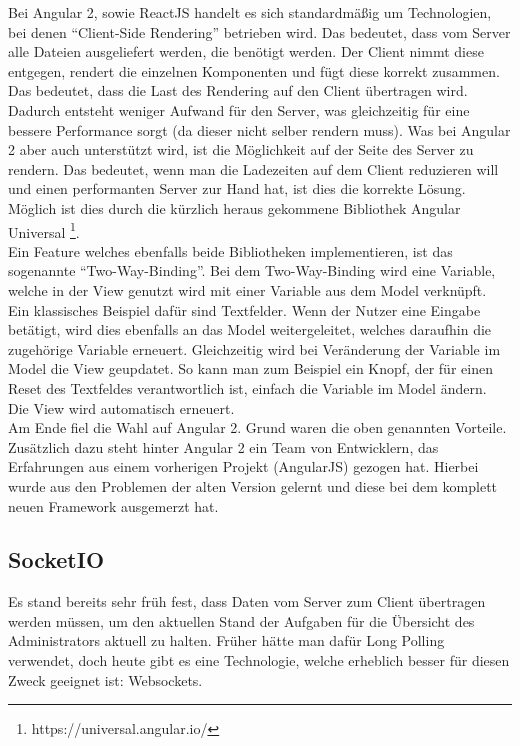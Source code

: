 Bei Angular 2, sowie ReactJS handelt es sich standardmäßig um Technologien, bei denen ``Client-Side Rendering'' betrieben wird. Das bedeutet, dass vom Server alle Dateien ausgeliefert werden, die benötigt werden. Der Client nimmt diese entgegen, rendert die einzelnen Komponenten und fügt diese korrekt zusammen. Das bedeutet, dass die Last des Rendering auf den Client übertragen wird. Dadurch entsteht weniger Aufwand für den Server, was gleichzeitig für eine bessere Performance sorgt (da dieser nicht selber rendern muss). Was bei Angular 2 aber auch unterstützt wird, ist die Möglichkeit auf der Seite des Server zu rendern. Das bedeutet, wenn man  die Ladezeiten auf dem Client reduzieren will und einen performanten Server zur Hand hat, ist dies die korrekte Lösung. Möglich ist dies durch die kürzlich heraus gekommene Bibliothek Angular Universal  \footnote{https://universal.angular.io/}. \\

Ein Feature welches ebenfalls beide Bibliotheken implementieren, ist das sogenannte ``Two-Way-Binding''. Bei dem Two-Way-Binding wird eine Variable, welche in der View genutzt wird mit einer Variable aus dem Model verknüpft. Ein klassisches Beispiel dafür sind Textfelder. Wenn der Nutzer eine Eingabe betätigt, wird dies ebenfalls an das Model weitergeleitet, welches daraufhin die zugehörige Variable erneuert. Gleichzeitig wird bei Veränderung der Variable im Model die View geupdatet. So kann man zum Beispiel ein Knopf, der für einen Reset des Textfeldes verantwortlich ist, einfach die Variable im Model ändern. Die View wird automatisch erneuert. \\

Am Ende fiel die Wahl auf Angular 2. Grund waren die oben genannten Vorteile. Zusätzlich dazu steht hinter Angular 2 ein Team von Entwicklern, das Erfahrungen aus einem vorherigen Projekt (AngularJS) gezogen hat. Hierbei wurde aus den Problemen der alten Version gelernt und diese bei dem komplett neuen Framework ausgemerzt hat.

\subsection{SocketIO}

Es stand bereits sehr früh fest, dass Daten vom Server zum Client übertragen werden müssen, um den aktuellen Stand der Aufgaben für die Übersicht des Administrators aktuell zu halten. Früher hätte man dafür Long Polling verwendet, doch heute gibt es eine Technologie, welche erheblich besser für diesen Zweck geeignet ist: Websockets. \\


